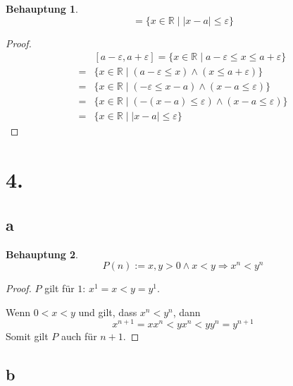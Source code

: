 \documentclass[a4paper,10pt]{article}
\newtheorem*{claim}{Behauptung}
\begin{document}
\begin{claim}
 \begin{equation*}
  [a - \varepsilon, a + \varepsilon] = \{x \in \mathbb{R} \mid |x - a| \le \varepsilon\}
 \end{equation*}
\end{claim}

\begin{proof}
 \begin{align*}
  & [a - \varepsilon, a + \varepsilon] = \{x \in \mathbb{R} \mid a - \varepsilon \le x \le a + \varepsilon\}\\
  = & \{x \in \mathbb{R} \mid (a - \varepsilon \le x) \land (x \le a + \varepsilon)\}\\
  = & \{x \in \mathbb{R} \mid (-\varepsilon \le x - a) \land (x - a \le \varepsilon)\}\\
  = & \{x \in \mathbb{R} \mid (-(x - a) \le \varepsilon) \land (x - a \le \varepsilon)\}\\
  = & \{x \in \mathbb{R} \mid |x - a| \le \varepsilon\}
 \end{align*}
\end{proof}

\section*{4.}

\subsection*{a}

\begin{claim}
 \begin{equation*}
  P(n) := x, y > 0 \land x < y \Rightarrow x^n < y^n
 \end{equation*}
\end{claim}

\begin{proof}
 $P$ gilt für $1$: $x^1 = x < y = y^1$.
 
 Wenn $0 < x < y$ und gilt, dass $x^n < y^n$, dann
 \begin{equation*}
  x^{n + 1} = xx^n < yx^n < yy^n = y^{n + 1}
 \end{equation*}
 Somit gilt $P$ auch für $n + 1$.
\end{proof}

\subsection*{b}
\end{document}
